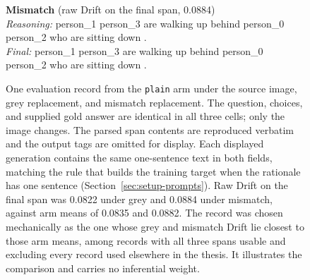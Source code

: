 \begin{figure}[ht]
\begin{minipage}{0.94\textwidth}
\vspace{3pt}
\textbf{Mismatch} (raw Drift on the final span, 0.0884)\\
\textit{Reasoning:} person\_1 person\_3 are walking up behind person\_0 person\_2 who are sitting down .\\
\textit{Final:} person\_1 person\_3 are walking up behind person\_0 person\_2 who are sitting down .
\end{minipage}
\caption[Paired rationale example]{One evaluation record from the
\texttt{plain} arm under the source image, grey replacement, and mismatch
replacement. The question, choices, and supplied gold answer are identical in all
three cells; only the image changes. The parsed span contents are reproduced
verbatim and the output tags are omitted for display. Each displayed generation
contains the same one-sentence text in both fields, matching the rule that builds
the training target when the rationale has one sentence (Section~\ref{sec:setup-prompts}). Raw
Drift on the final span was 0.0822 under grey and 0.0884 under mismatch, against
arm means of 0.0835 and 0.0882. The record was chosen mechanically as the one
whose grey and mismatch Drift lie closest to those arm means, among records with
all three spans usable and excluding every record used elsewhere in the thesis.
It illustrates the comparison and carries no inferential weight.}
\label{fig:rq2-paired-example}
\end{figure}

